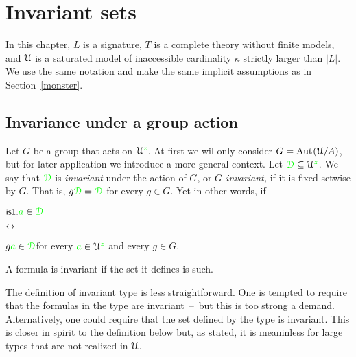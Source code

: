 \chapter{Invariant sets}
\label{invariant}

\def\medrel#1{\parbox[t]{5ex}{$\displaystyle\hfil #1$}}
\def\ceq#1#2#3{\parbox[t]{14ex}{$\displaystyle #1$}\medrel{#2}{$\displaystyle #3$}}

In this chapter, $L$ is a signature, $T$ is a complete theory without finite models, and $\EuScript U$ is a saturated model of inaccessible cardinality $\kappa$ strictly larger than $|L|$.
We use the same notation and make the same implicit assumptions as in Section~\ref{monster}.

\section{Invariance under a group action}\label{invariant_sets}

Let $G$ be a group that acts on $\EuScript U^{\color{green} z}$.
At first we wil only consider $G={\rm Aut\kern.15ex}(\EuScript U/A)$, but for later application we introduce a more general context.
Let ${\color{green}\EuScript D}\subseteq\EuScript U^{\color{green} z}$.
We say that ${\color{green}\EuScript D}$ is \emph{invariant\/} under the action of $G$, or \emph{$G$-invariant,} if it is fixed setwise by $G$.
That is, $g{\color{green}\EuScript D}={\color{green}\EuScript D}$ for every $g\in G$.
Yet in other words, if

\ceq{\ssf{is1.}\hfill {\gr a}\in\grD}{\iff}{g{\gr a}\in\grD}\hfill for every ${\color{green} a}\in\EuScript U^{\color{green} z}$ and every $g\in G$.

A formula is invariant if the set it defines is such.



The definition of invariant type is less straightforward.
One is tempted to require that the formulas in the type are invariant~--~but this is too strong a demand.
Alternatively, one could require that the set defined by the type is invariant.
This is closer in spirit to the definition below but, as stated, it is meaninless for large types that are not realized in $\EuScript U$.

